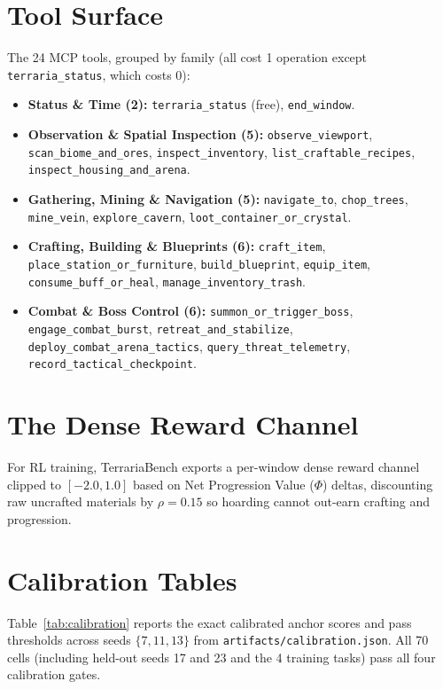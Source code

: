 \documentclass[10pt,letterpaper]{article}
\begin{document}
\section{Tool Surface}
\label{app:tools}
The 24 MCP tools, grouped by family (all cost 1 operation except \texttt{terraria\_status}, which costs 0):
\begin{itemize}[leftmargin=18pt,itemsep=2pt]
  \item \textbf{Status \& Time (2):} \texttt{terraria\_status} (free), \texttt{end\_window}.
  \item \textbf{Observation \& Spatial Inspection (5):} \texttt{observe\_viewport}, \texttt{scan\_biome\_and\_ores}, \texttt{inspect\_inventory}, \texttt{list\_craftable\_recipes}, \texttt{inspect\_housing\_and\_arena}.
  \item \textbf{Gathering, Mining \& Navigation (5):} \texttt{navigate\_to}, \texttt{chop\_trees}, \texttt{mine\_vein}, \texttt{explore\_cavern}, \texttt{loot\_container\_or\_crystal}.
  \item \textbf{Crafting, Building \& Blueprints (6):} \texttt{craft\_item}, \texttt{place\_station\_or\_furniture}, \texttt{build\_blueprint}, \texttt{equip\_item}, \texttt{consume\_buff\_or\_heal}, \texttt{manage\_inventory\_trash}.
  \item \textbf{Combat \& Boss Control (6):} \texttt{summon\_or\_trigger\_boss}, \texttt{engage\_combat\_burst}, \texttt{retreat\_and\_stabilize}, \texttt{deploy\_combat\_arena\_tactics}, \texttt{query\_threat\_telemetry}, \texttt{record\_tactical\_checkpoint}.
\end{itemize}

\section{The Dense Reward Channel}
\label{app:dense}
For RL training, TerrariaBench exports a per-window dense reward channel clipped to $[-2.0, 1.0]$ based on Net Progression Value ($\Phi$) deltas, discounting raw uncrafted materials by $\rho = 0.15$ so hoarding cannot out-earn crafting and progression.

\section{Calibration Tables}
\label{app:calibration}

Table~\ref{tab:calibration} reports the exact calibrated anchor scores and pass thresholds across seeds $\{7, 11, 13\}$ from \texttt{artifacts/calibration.json}. All 70 cells (including held-out seeds 17 and 23 and the 4 training tasks) pass all four calibration gates.
\end{document}
